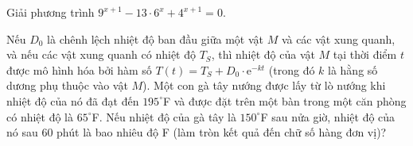 \begin{ex}%
		Giải phương trình $9^{x+1}-13\cdot 6^x+4^{x+1}=0$.
\end{ex}

\begin{ex}%
	Nếu $D_0$ là chênh lệch nhiệt độ ban đầu giữa một vật $M$ và các vật xung quanh, và nếu các vật xung quanh có nhiệt độ $T_S$, thì nhiệt độ của vật $M$ tại thời điểm $t$ được mô hình hóa bởi hàm số $T(t)=T_S+D_0 \cdot \mathrm{e}^{-kt}$ (trong đó $k$ là hằng số dương phụ thuộc vào vật $M$). Một con gà tây nướng được lấy từ lò nướng khi nhiệt độ của nó đã đạt đến $195^\circ$F và được đặt trên một bàn trong một căn phòng có nhiệt độ là $65^\circ$F. Nếu nhiệt độ của gà tây là $150^\circ$F sau nửa giờ, nhiệt độ của nó sau $60$ phút là bao nhiêu độ F (làm tròn kết quả đến chữ số hàng đơn vị)? 
\end{ex}

